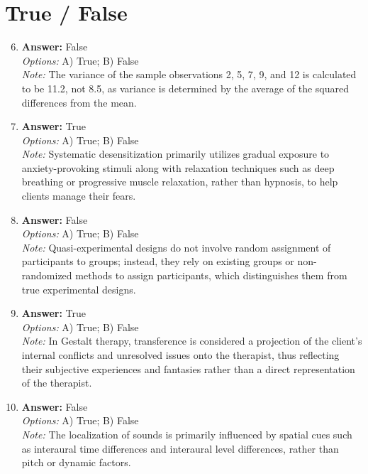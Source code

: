 \documentclass[12pt]{article}
\begin{document}
\section*{True / False}
\begin{enumerate}[label=\arabic*.]
\setcounter{enumi}{5}
\item \textbf{Answer:} False
\\ \textit{Options:} A) True; B) False
\\ \textit{Note:} The variance of the sample observations 2, 5, 7, 9, and 12 is calculated to be 11.2, not 8.5, as variance is determined by the average of the squared differences from the mean.
\item \textbf{Answer:} True
\\ \textit{Options:} A) True; B) False
\\ \textit{Note:} Systematic desensitization primarily utilizes gradual exposure to anxiety-provoking stimuli along with relaxation techniques such as deep breathing or progressive muscle relaxation, rather than hypnosis, to help clients manage their fears.
\item \textbf{Answer:} False
\\ \textit{Options:} A) True; B) False
\\ \textit{Note:} Quasi-experimental designs do not involve random assignment of participants to groups; instead, they rely on existing groups or non-randomized methods to assign participants, which distinguishes them from true experimental designs.
\item \textbf{Answer:} True
\\ \textit{Options:} A) True; B) False
\\ \textit{Note:} In Gestalt therapy, transference is considered a projection of the client's internal conflicts and unresolved issues onto the therapist, thus reflecting their subjective experiences and fantasies rather than a direct representation of the therapist.
\item \textbf{Answer:} False
\\ \textit{Options:} A) True; B) False
\\ \textit{Note:} The localization of sounds is primarily influenced by spatial cues such as interaural time differences and interaural level differences, rather than pitch or dynamic factors.
\end{enumerate}
\end{document}
